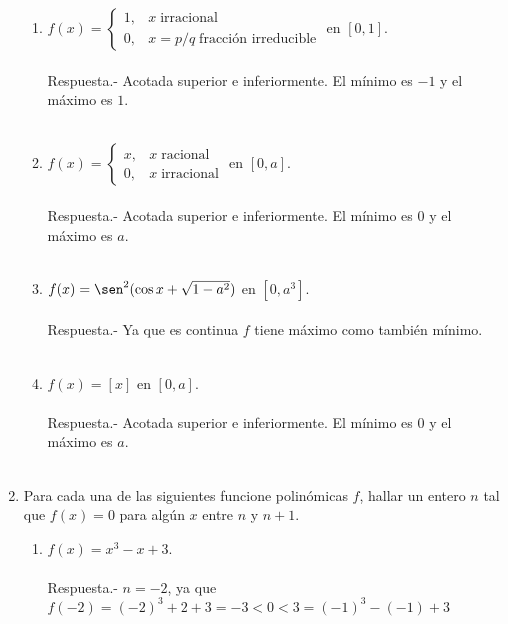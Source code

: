 \begin{enumerate}
\begin{enumerate}[\bfseries (i)]
	\item $f(x) = \left\{\begin{array}{ll}1, & x \; \mbox{irracional} \\ 0, & x=p/q\; \mbox{fracción irreducible}\end{array}\right.$ en $[0,1]$.\\\\
	    Respuesta.-\; Acotada superior e inferiormente. El mínimo es $-1$ y el máximo es $1$.\\\\

	\item $f(x) = \left\{ \begin{array}{ll} x, & x\; \mbox{racional} \\ 0, & x\; \mbox{irracional}\end{array} \right.$ en $[0,a]$.\\\\
		Respuesta.-\; Acotada superior e inferiormente. El mínimo es $0$ y el máximo es $a$.\\\\

	\item $f(x) = \sen^2(\cos x + \sqrt{1-a^2})$ en $[0,a^3]$.\\\\
	    Respuesta.-\; Ya que es continua $f$ tiene máximo como también mínimo.\\\\

	\item $f(x)=[x]$ en $[0,a]$.\\\\
	    Respuesta.-\; Acotada superior e inferiormente. El mínimo es $0$ y el máximo es $a$.\\\\

    \end{enumerate}

\item Para cada una de las siguientes funcione polinómicas $f$, hallar un entero $n$ tal que $f(x)=0$ para algún $x$ entre $n$ y $n+1$.\\
    \begin{enumerate}[\bfseries (i)]

	\item $f(x)=x^3-x+3$.\\\\
	    Respuesta.-\; $n=-2$, ya que $f(-2) = (-2)^3+2+3 = -3 < 0 <  3 =  (-1)^3 - (-1) + 3$\\\\


\end{enumerate}
\end{enumerate}
